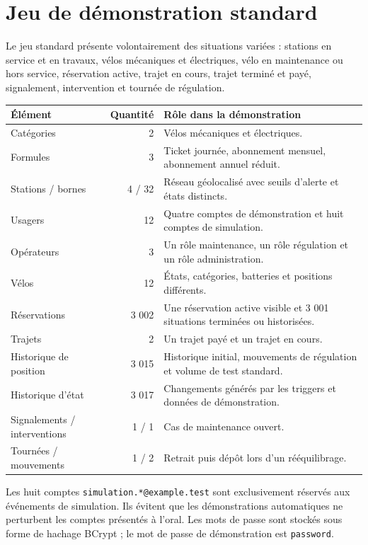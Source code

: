 \documentclass[11pt,a4paper]{article}
\begin{document}
\section{Jeu de démonstration standard}
Le jeu standard présente volontairement des situations variées : stations en service et en travaux, vélos mécaniques et électriques, vélo en maintenance ou hors service, réservation active, trajet en cours, trajet terminé et payé, signalement, intervention et tournée de régulation.

\begin{center}
\begin{tabular}{lrp{7cm}}
\toprule
\textbf{Élément} & \textbf{Quantité} & \textbf{Rôle dans la démonstration}\\
\midrule
Catégories & 2 & Vélos mécaniques et électriques.\\
Formules & 3 & Ticket journée, abonnement mensuel, abonnement annuel réduit.\\
Stations / bornes & 4 / 32 & Réseau géolocalisé avec seuils d'alerte et états distincts.\\
Usagers & 12 & Quatre comptes de démonstration et huit comptes de simulation.\\
Opérateurs & 3 & Un rôle maintenance, un rôle régulation et un rôle administration.\\
Vélos & 12 & États, catégories, batteries et positions différents.\\
Réservations & 3 002 & Une réservation active visible et 3 001 situations terminées ou historisées.\\
Trajets & 2 & Un trajet payé et un trajet en cours.\\
Historique de position & 3 015 & Historique initial, mouvements de régulation et volume de test standard.\\
Historique d'état & 3 017 & Changements générés par les triggers et données de démonstration.\\
Signalements / interventions & 1 / 1 & Cas de maintenance ouvert.\\
Tournées / mouvements & 1 / 2 & Retrait puis dépôt lors d'un rééquilibrage.\\
\bottomrule
\end{tabular}
\end{center}

Les huit comptes \texttt{simulation.*@example.test} sont exclusivement réservés aux événements de simulation. Ils évitent que les démonstrations automatiques ne perturbent les comptes présentés à l'oral. Les mots de passe sont stockés sous forme de hachage BCrypt ; le mot de passe de démonstration est \texttt{password}.
\end{document}
